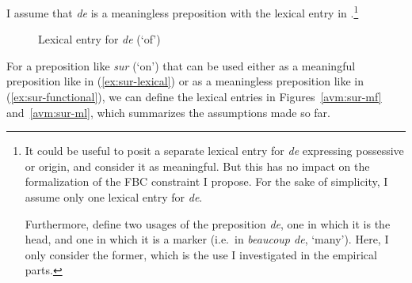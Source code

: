 I assume that \emph{de} is a meaningless preposition with the lexical entry in .\footnote{It could be useful to posit a separate lexical entry for \emph{de} expressing possessive or origin, and consider it as meaningful. But this has no impact on the formalization of the FBC constraint I propose. For the sake of simplicity, I assume only one lexical entry for \emph{de}. 

Furthermore, \citet{Abeille.2006.AandDe} define two usages of the preposition \emph{de}, one in which it is the head, and one in which it is a marker (i.e.\ in \emph{beaucoup de}, `many'). Here, I only consider the former, which is the use I investigated in the empirical parts.} 

\begin{figure}
\caption{Lexical entry for \emph{de} (`of')}
\label{avm:de}
\end{figure}

For a preposition like \emph{sur} (`on') that can be used either as a meaningful preposition like in (\ref{ex:sur-lexical}) or as a meaningless preposition like in (\ref{ex:sur-functional}), we can define the lexical entries in Figures~\ref{avm:sur-mf} and~\ref{avm:sur-ml}, which summarizes the assumptions made so far.

